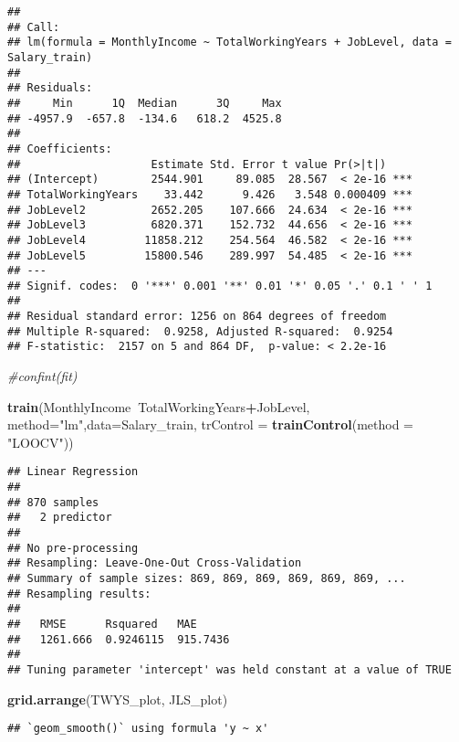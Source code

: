 \documentclass[
]{article}
\newenvironment{Shaded}{\begin{snugshade}}{\end{snugshade}}
\newcommand{\CommentTok}[1]{\textcolor[rgb]{0.56,0.35,0.01}{\textit{#1}}}
\newcommand{\DataTypeTok}[1]{\textcolor[rgb]{0.13,0.29,0.53}{#1}}
\newcommand{\KeywordTok}[1]{\textcolor[rgb]{0.13,0.29,0.53}{\textbf{#1}}}
\newcommand{\NormalTok}[1]{#1}
\newcommand{\OperatorTok}[1]{\textcolor[rgb]{0.81,0.36,0.00}{\textbf{#1}}}
\newcommand{\StringTok}[1]{\textcolor[rgb]{0.31,0.60,0.02}{#1}}
\begin{document}
\begin{verbatim}
## 
## Call:
## lm(formula = MonthlyIncome ~ TotalWorkingYears + JobLevel, data = Salary_train)
## 
## Residuals:
##     Min      1Q  Median      3Q     Max 
## -4957.9  -657.8  -134.6   618.2  4525.8 
## 
## Coefficients:
##                    Estimate Std. Error t value Pr(>|t|)    
## (Intercept)        2544.901     89.085  28.567  < 2e-16 ***
## TotalWorkingYears    33.442      9.426   3.548 0.000409 ***
## JobLevel2          2652.205    107.666  24.634  < 2e-16 ***
## JobLevel3          6820.371    152.732  44.656  < 2e-16 ***
## JobLevel4         11858.212    254.564  46.582  < 2e-16 ***
## JobLevel5         15800.546    289.997  54.485  < 2e-16 ***
## ---
## Signif. codes:  0 '***' 0.001 '**' 0.01 '*' 0.05 '.' 0.1 ' ' 1
## 
## Residual standard error: 1256 on 864 degrees of freedom
## Multiple R-squared:  0.9258, Adjusted R-squared:  0.9254 
## F-statistic:  2157 on 5 and 864 DF,  p-value: < 2.2e-16
\end{verbatim}

\begin{Shaded}
\begin{Highlighting}[]
\CommentTok{#confint(fit)}

\KeywordTok{train}\NormalTok{(MonthlyIncome}\OperatorTok{~}\NormalTok{TotalWorkingYears}\OperatorTok{+}\NormalTok{JobLevel, }\DataTypeTok{method=}\StringTok{"lm"}\NormalTok{,}\DataTypeTok{data=}\NormalTok{Salary_train, }\DataTypeTok{trControl =} \KeywordTok{trainControl}\NormalTok{(}\DataTypeTok{method =} \StringTok{"LOOCV"}\NormalTok{))}
\end{Highlighting}
\end{Shaded}

\begin{verbatim}
## Linear Regression 
## 
## 870 samples
##   2 predictor
## 
## No pre-processing
## Resampling: Leave-One-Out Cross-Validation 
## Summary of sample sizes: 869, 869, 869, 869, 869, 869, ... 
## Resampling results:
## 
##   RMSE      Rsquared   MAE     
##   1261.666  0.9246115  915.7436
## 
## Tuning parameter 'intercept' was held constant at a value of TRUE
\end{verbatim}

\begin{Shaded}
\begin{Highlighting}[]
\KeywordTok{grid.arrange}\NormalTok{(TWYS_plot, JLS_plot)}
\end{Highlighting}
\end{Shaded}

\begin{verbatim}
## `geom_smooth()` using formula 'y ~ x'
\end{verbatim}
\end{document}
